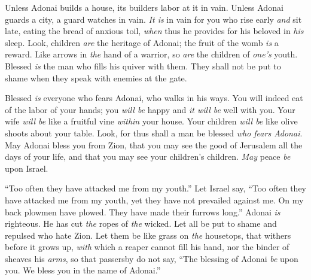 \begin{biblechapter} %
 Unless Adonai builds a house, 
its builders labor at it in vain. 
Unless Adonai guards a city, 
a guard watches in vain.
\verse \textit{It is} in vain for you who rise early \textit{and} sit late, 
eating the bread of anxious toil, 
\textit{when} thus he provides for his beloved in \textit{his} sleep.
\verse Look, children \textit{are} the heritage of Adonai; 
the fruit of the womb \textit{is} a reward.
\verse Like arrows in \textit{the} hand of a warrior, 
so \textit{are} the children of \textit{one’s} youth.
\verse Blessed \textit{is} the man who fills his quiver with them. 
They shall not be put to shame 
when they speak with enemies at the gate.
\end{biblechapter}

\begin{biblechapter} %
 Blessed \textit{is} everyone who fears Adonai, 
who walks in his ways.
\verse You will indeed eat of the labor of your hands; 
you \textit{will be} happy and \textit{it will be} well with you.
\verse Your wife \textit{will be} like a fruitful vine 
\textit{within} your house. 
Your children \textit{will be} like olive shoots 
about your table.
\verse Look, for thus shall a man be blessed 
\textit{who fears Adonai}.
\verse May Adonai bless you from Zion, 
that you may see the good of Jerusalem 
all the days of your life,
\verse and that you may see your children’s children. 
\textit{May} peace \textit{be} upon Israel.
\end{biblechapter}

\begin{biblechapter} %
 “Too often they have attacked me from my youth.” 
Let Israel say,
\verse “Too often they have attacked me from my youth, 
yet they have not prevailed against me.
\verse On my back plowmen have plowed. 
They have made their furrows long.”
\verse Adonai \textit{is} righteous. 
He has cut \textit{the} ropes of \textit{the} wicked.
\verse Let all be put to shame and repulsed 
who hate Zion.
\verse Let them be like grass on \textit{the} housetops, 
that withers before it grows up,
\verse \textit{with} which a reaper cannot fill his hand, 
nor the binder of sheaves his \textit{arms},
\verse so that passersby do not say, 
“The blessing of Adonai \textit{be} upon you. 
We bless you in the name of Adonai.”
\end{biblechapter}


